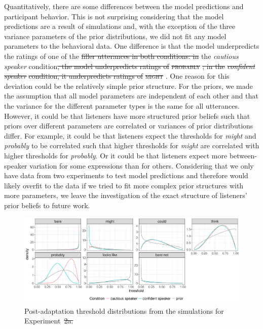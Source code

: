 \documentclass[man, floatsintext]{apa6}
\providecommand{\DIFadd}[1]{{\protect\color{blue}\uwave{#1}}} %
\providecommand{\DIFdel}[1]{{\protect\color{red}\sout{#1}}}                      %
\providecommand{\DIFaddbegin}{} %
\providecommand{\DIFaddend}{} %
\providecommand{\DIFdelbegin}{} %
\providecommand{\DIFdelend}{} %
\providecommand{\DIFaddFL}[1]{\DIFadd{#1}} %
\providecommand{\DIFdelFL}[1]{\DIFdel{#1}} %
\providecommand{\DIFaddbeginFL}{} %
\providecommand{\DIFaddendFL}{} %
\providecommand{\DIFdelbeginFL}{} %
\providecommand{\DIFdelendFL}{} %
\newcommand{\DIFscaledelfig}{0.5}
\newlength{\DIFdelgraphicswidth} %
\newlength{\DIFdelgraphicsheight} %
\newcommand{\DIFaddincludegraphics}[2][]{{\color{blue}\fbox{\DIFOincludegraphics[#1]{#2}}}} %
\newcommand{\DIFdelincludegraphics}[2][]{%
\sbox{\DIFdelgraphicsbox}{\DIFOincludegraphics[#1]{#2}}%
\settoboxwidth{\DIFdelgraphicswidth}{\DIFdelgraphicsbox} %
\settoboxtotalheight{\DIFdelgraphicsheight}{\DIFdelgraphicsbox} %
\scalebox{\DIFscaledelfig}{%
\parbox[b]{\DIFdelgraphicswidth}{\usebox{\DIFdelgraphicsbox}\\[-\baselineskip] \rule{\DIFdelgraphicswidth}{0em}}\llap{\resizebox{\DIFdelgraphicswidth}{\DIFdelgraphicsheight}{%
\setlength{\unitlength}{\DIFdelgraphicswidth}%
\begin{picture}(1,1)%
\thicklines\linethickness{2pt} %
{\color[rgb]{1,0,0}\put(0,0){\framebox(1,1){}}}%
{\color[rgb]{1,0,0}\put(0,0){\line( 1,1){1}}}%
{\color[rgb]{1,0,0}\put(0,1){\line(1,-1){1}}}%
\end{picture}%
}\hspace*{3pt}}} %
} %
\DeclareRobustCommand{\DIFaddbegin}{\DIFOaddbegin \let\includegraphics\DIFaddincludegraphics} %
\DeclareRobustCommand{\DIFaddend}{\DIFOaddend \let\includegraphics\DIFOincludegraphics} %
\DeclareRobustCommand{\DIFdelbegin}{\DIFOdelbegin \let\includegraphics\DIFdelincludegraphics} %
\DeclareRobustCommand{\DIFdelend}{\DIFOaddend \let\includegraphics\DIFOincludegraphics} %
\DeclareRobustCommand{\DIFaddbeginFL}{\DIFOaddbeginFL \let\includegraphics\DIFaddincludegraphics} %
\DeclareRobustCommand{\DIFaddendFL}{\DIFOaddendFL \let\includegraphics\DIFOincludegraphics} %
\DeclareRobustCommand{\DIFdelbeginFL}{\DIFOdelbeginFL \let\includegraphics\DIFdelincludegraphics} %
\DeclareRobustCommand{\DIFdelendFL}{\DIFOaddendFL \let\includegraphics\DIFOincludegraphics} %
\begin{document}
Quantitatively, there are some differences between the model predictions and participant behavior. This is not surprising considering that the model predictions are a result of simulations
and, with the exception of the three variance parameters of the prior distributions, we did not fit any model parameters to the behavioral data. One difference is that the model underpredicts 
the ratings of one of the  \DIFdelbegin \DIFdel{filler utterances in both conditions: in }\DIFdelend \DIFaddbegin \textsc{\DIFadd{probably}} \DIFadd{utterances in }\DIFaddend the \textit{cautious speaker} condition\DIFdelbegin \DIFdel{, the model underpredicts ratings of }\textsc{\DIFdel{probably}}%
\DIFdel{; in the }\textit{\DIFdel{confident speaker}} %
\DIFdel{condition, it underpredicts
ratings of }\textsc{\DIFdel{might}}%
\DIFdelend .
 One reason for this deviation could be the relatively simple prior structure. For the priors, we made the assumption that all model parameters are independent of each other and 
that the variance for the different parameter types is the same for all utterances. However, it could be that listeners have more structured prior beliefs such that priors over different parameters are correlated or
variances of prior distributions differ. For example, it could be that listeners expect the thresholds for \textit{might} and \textit{probably} to be correlated such that higher thresholds for \textit{might} are correlated 
with higher thresholds for \textit{probably}. Or it could be that listeners expect more between-speaker variation for some expressions than for others. Considering that we only have data from two experiments to test
model predictions and therefore would likely overfit to the data if we tried to fit more complex prior structures with more parameters, we leave  the investigation of the exact structure of listeners' prior beliefs to future work.

\begin{figure}
  \DIFdelbeginFL %
\DIFdelendFL \DIFaddbeginFL \includegraphics[width=\textwidth]{plots/adaptation-posterior-thresholds-replication.pdf}
  \DIFaddendFL \caption{Post-adaptation threshold distributions from the simulations for Experiment~\DIFdelbeginFL \DIFdelFL{2a. }\DIFdelendFL \DIFaddbeginFL \DIFaddFL{2. }\DIFaddendFL \label{fig:post-exposure-thresholds}}
\end{figure}
\end{document}
